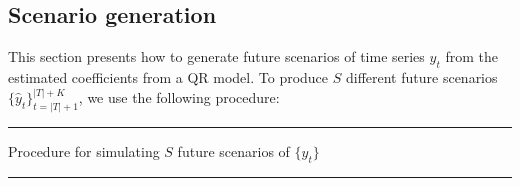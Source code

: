 \subsection{Scenario generation} \label{sec:scenario-generation}

This section presents how to generate future scenarios of time series $y_t$ from the estimated coefficients from a QR model. 
To produce $S$ different future scenarios $\{ \hat{y}_t \}_{t=|T|+1}^{|T|+K}$, we use the following procedure:

\noindent\rule{\columnwidth}{3pt}

Procedure for simulating $S$ future scenarios of $\{y_t\}$

\noindent\rule{\columnwidth}{1pt}

